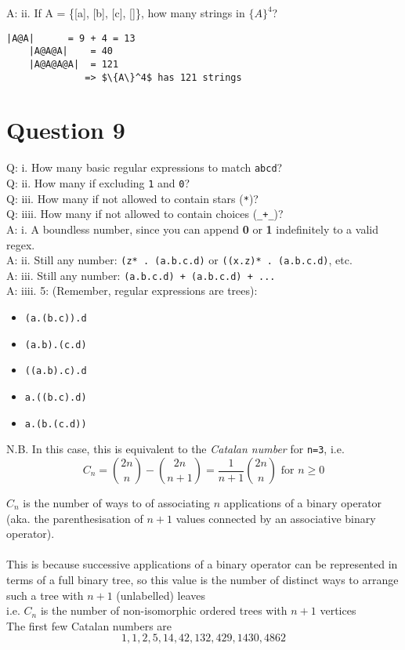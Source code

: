 \documentclass[english]{scrartcl}
\begin{document}
A: ii. If A = \{[a], [b], [c], []\}, how many strings in $\{A\}^4$?

\begin{Verbatim}[mathescape,commandchars=\\\{\}]
    |A@A|      = 9 + 4 = 13
    |A@A@A|    = 40
    |A@A@A@A|  = 121
              => $\{A\}^4$ has 121 strings
\end{Verbatim}

\section*{Question 9}
Q: i. How many basic regular expressions to match \verb.abcd.? \\
Q: ii. How many if excluding \verb.1. and \verb.0.? \\
Q: iii. How many if not allowed to contain stars (\verb.*.)? \\
Q: iiii. How many if not allowed to contain choices (\verb._+_.)? \\
\newline
A: i. A boundless number, since you can append \textbf{0} or \textbf{1} indefinitely to a valid regex. \\
A: ii. Still any number: \verb|(z* . (a.b.c.d)| or \verb|((x.z)* . (a.b.c.d)|, etc. \\
A: iii. Still any number: \verb|(a.b.c.d) + (a.b.c.d) + ...| \\
A: iiii. 5: (Remember, regular expressions are trees):
\begin{itemize}
  \item \verb|(a.(b.c)).d|
  \item \verb|(a.b).(c.d)|
  \item \verb|((a.b).c).d|
  \item \verb|a.((b.c).d)|
  \item \verb|a.(b.(c.d))|
\end{itemize}

N.B. In this case, this is equivalent to the \textit{Catalan number} for \verb|n=3|, i.e.
\[
  C_n = \binom{2n}{n} - \binom{2n}{n+1} = \frac{1}{n+1}\binom{2n}{n} \text{ for } n \ge 0
\]

$C_n$ is the number of ways to of associating $n$ applications of a binary operator (aka. the parenthesisation of $n+1$ values connected by an associative binary operator). \\
\\
This is because successive applications of a binary operator can be represented in terms of a full binary tree,
so this value is the number of distinct ways to arrange such a tree with $n+1$ (unlabelled) leaves
\\ i.e. $C_n$ is the number of non-isomorphic ordered trees with $n + 1$ vertices
\\
The first few Catalan numbers are $$1,1,2,5,14,42,132,429,1430,4862$$
\end{document}
